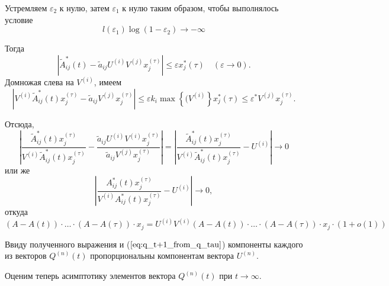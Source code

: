 \documentclass[12pt]{article}
\renewcommand{\leq}{\leqslant}
\renewcommand{\epsilon}{\varepsilon}
\begin{document}
{Устремляем $\epsilon_2$ к нулю, затем $\epsilon_1$ к нулю таким образом, чтобы выполнялось условие
\begin{equation}
	l(\epsilon_1) \log(1 - \epsilon_2) \rightarrow -\infty
\end{equation}

Тогда 
\begin{equation}
	\left| \tilde{A}^*_{ij}(t) - \tilde{a}_{ij} U^{(i)} V^{(j)} x^{(\tau)}_j \right| \leq \epsilon x^*_j(\tau)\quad (\epsilon \rightarrow 0).
\end{equation}
Домножая слева на $V^{(i)}$, имеем
\begin{equation}
	\left| V^{(i)} \tilde{A}^*_{ij}(t) x^{(\tau)}_j - \tilde{a}_{ij} V^{(j)} x^{(\tau)}_j \right| \leq \epsilon k_i \max \left\{ (V^{(i)} \right\} x^*_j(\tau) \leq \epsilon^* V^{(j)} x^{(\tau)}_j.
\end{equation}

Отсюда,
\begin{equation}
	\left| \frac{\tilde{A}^*_{ij}(t) x^{(\tau)}_j}{V^{(i)} \tilde{A}^*_{ij}(t) x^{(\tau)}_j} - \frac{\tilde{a}_{ij} U^{(i)} V^{(i)} x^{(\tau)}_j}{\tilde{a}_{ij} V^{(j)} x^{(\tau)}_j} \right| = \left| \frac{\tilde{A}^*_{ij}(t) x^{(\tau)}_j}{V^{(i)} \tilde{A}^*_{ij}(t) x^{(\tau)}_j} - U^{(i)} \right| \rightarrow 0
\end{equation}
или же
\begin{equation}
	\left| \frac{A^*_{ij}(t) x^{(\tau)}_j}{V^{(i)} A^*_{ij}(t) x^{(\tau)}_j} - U^{(i)} \right| \rightarrow 0,
\end{equation}
откуда
\begin{equation}
	(A - A(t)) \cdot \ldots \cdot (A - A(\tau)) \cdot x_j = U^{(i)} V^{(i)} (A - A(t)) \cdot \ldots \cdot (A - A(\tau)) \cdot x_j \cdot (1 + o(1))
\end{equation}

Ввиду полученного выражения и ($\ref{eq:q_t+1_from_q_tau}$) компоненты каждого из векторов $Q^{(n)}(t)$ пропорциональны компонентам вектора $U^{(n)}$.

Оценим теперь асимптотику элементов вектора $Q^{(n)}(t)$ при $t \rightarrow \infty$.

}
\end{document}
